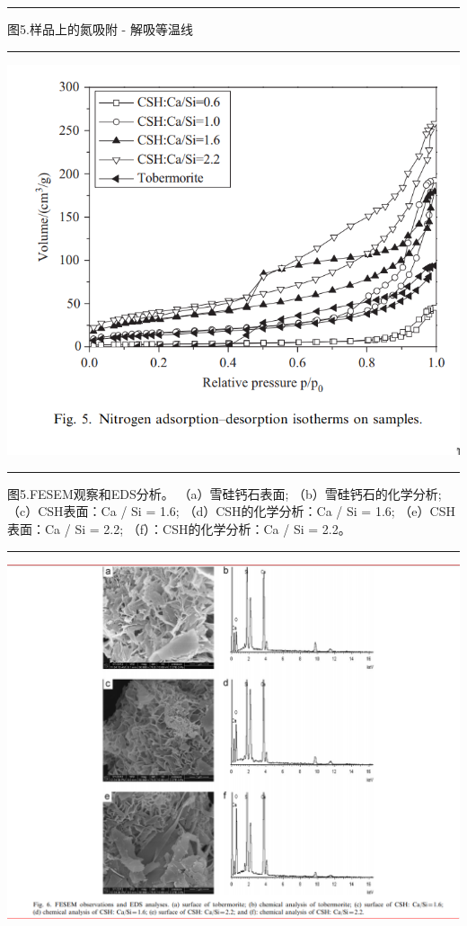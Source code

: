 \documentclass[11pt]{article}
\begin{document}
\noindent\rule{\textwidth}{0.5pt}
图5.样品上的氮吸附 - 解吸等温线

\noindent\rule{\textwidth}{0.5pt}
\includegraphics[scale=0.5]{fig.5.png}

\noindent\rule{\textwidth}{0.5pt}
图5.FESEM观察和EDS分析。 （a）雪硅钙石表面; （b）雪硅钙石的化学分析; （c）CSH表面：Ca / Si = 1.6; （d）CSH的化学分析：Ca / Si = 1.6; （e）CSH表面：Ca / Si = 2.2; （f）：CSH的化学分析：Ca / Si = 2.2。

\noindent\rule{\textwidth}{0.5pt}
\includegraphics[scale=0.5]{fig.6.png}
\end{document}
